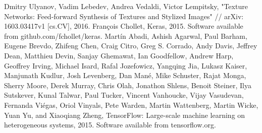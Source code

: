 \documentclass[a4paper]{article}
\begin{document}
\begin{thebibliography}{99}
		 Dmitry Ulyanov, Vadim Lebedev, Andrea Vedaldi, Victor Lempitsky, "Texture Networks: Feed-forward Synthesis of Textures and Stylized Images" // arXiv: 1603.03417v1 [cs.CV], 2016.
		 François Chollet, Keras, 2015. Software available from github.com/fchollet/keras.
		 Martín Abadi, Ashish Agarwal, Paul Barham, Eugene Brevdo,
		Zhifeng Chen, Craig Citro, Greg S. Corrado, Andy Davis,
		Jeffrey Dean, Matthieu Devin, Sanjay Ghemawat, Ian Goodfellow,
		Andrew Harp, Geoffrey Irving, Michael Isard, Rafal Jozefowicz, Yangqing Jia,
		Lukasz Kaiser, Manjunath Kudlur, Josh Levenberg, Dan Mané, Mike Schuster,
		Rajat Monga, Sherry Moore, Derek Murray, Chris Olah, Jonathon Shlens,
		Benoit Steiner, Ilya Sutskever, Kunal Talwar, Paul Tucker,
		Vincent Vanhoucke, Vijay Vasudevan, Fernanda Viégas,
		Oriol Vinyals, Pete Warden, Martin Wattenberg, Martin Wicke,
		Yuan Yu, and Xiaoqiang Zheng,
		TensorFlow: Large-scale machine learning on heterogeneous systems,
		2015. Software available from tensorflow.org.
	\end{thebibliography}
	
\end{document}
